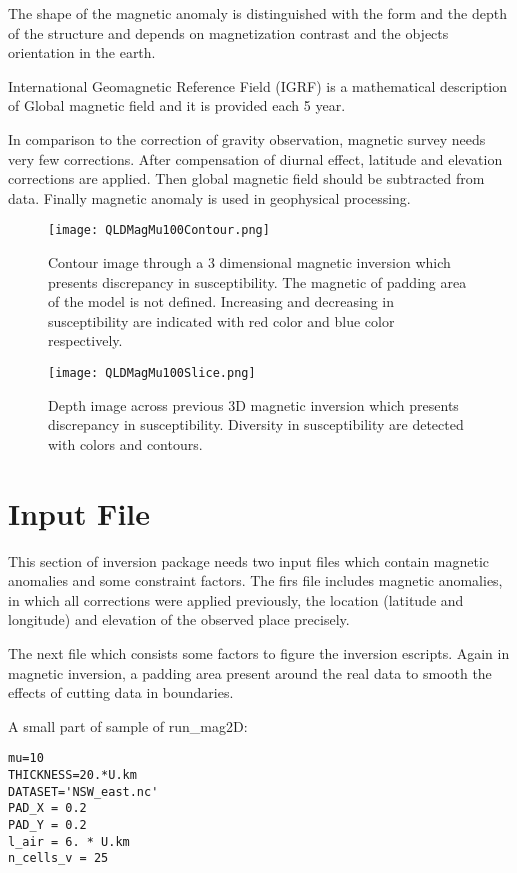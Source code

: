 The shape of the magnetic anomaly is distinguished with the form and the depth of the structure and depends on magnetization contrast and the objects orientation in the earth.

International Geomagnetic Reference Field (IGRF) is a mathematical description of Global magnetic field and it  is provided each 5 year.

In comparison to the correction of gravity observation, magnetic survey needs very few corrections. After compensation of diurnal effect, latitude and elevation corrections are applied. Then global magnetic field should be subtracted from data. Finally magnetic anomaly is used in geophysical processing.

\begin{figure}
\centering
\texttt{[image: QLDMagMu100Contour.png]}
\caption{Contour image through a 3 dimensional magnetic inversion which presents discrepancy in susceptibility. The magnetic of padding area of the model is not defined. Increasing and decreasing in susceptibility are indicated with red color and blue color respectively.}
\end{figure}

\begin{figure}
\centering
\texttt{[image: QLDMagMu100Slice.png]}
\caption{Depth image across previous 3D magnetic inversion which presents discrepancy in susceptibility. Diversity in susceptibility are detected with colors and contours.}
\end{figure}

\section{Input File} 

This section of inversion package needs two input files which contain magnetic anomalies and some constraint factors. The firs file includes magnetic anomalies, in which all corrections were applied previously, the location (latitude and longitude) and elevation of the observed place precisely.

The next file which consists some factors to figure the inversion escripts. Again in magnetic inversion, a padding area present around the real data to smooth the effects of cutting data in boundaries.
 
A small part of sample of run_mag2D:

\begin{verbatim}
mu=10
THICKNESS=20.*U.km
DATASET='NSW_east.nc'
PAD_X = 0.2
PAD_Y = 0.2
l_air = 6. * U.km
n_cells_v = 25
\end{verbatim}

